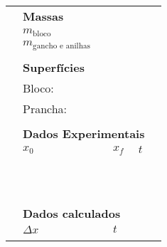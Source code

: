 \begin{table*}[!ht]
\centering
\begin{tabular}{lp{25mm}p{25mm}p{25mm}l}
\toprule
    & \textbf{Massas} & \\
    \cmidrule{2-3}
    & \cellcolor[gray]{0.89} $m_{\text{bloco}}$ & \cellcolor[gray]{0.92} & \\
    & \cellcolor[gray]{0.95} $m_{\text{gancho e anilhas}}$ & \cellcolor[gray]{0.97} & \\
    \cmidrule{2-3}
    \\
    & \textbf{Superfícies} \\
    \cmidrule{2-3}
    & \cellcolor[gray]{0.89} Bloco: & \cellcolor[gray]{0.92} \\
    & \cellcolor[gray]{0.95} Prancha: & \cellcolor[gray]{0.97} \\
    \cmidrule{2-3}
    \\
	&\multicolumn{3}{l}{\textbf{Dados Experimentais}} \\
	\cmidrule{2-4}
	& $x_0$ & $x_f$ & $t$ & \\
	\cmidrule{2-4}
	& \cellcolor[gray]{0.89} & \cellcolor[gray]{0.92} & \cellcolor[gray]{0.89} \\
	& \cellcolor[gray]{0.95} & \cellcolor[gray]{0.97} & \cellcolor[gray]{0.95} \\
	& \cellcolor[gray]{0.89} & \cellcolor[gray]{0.92} & \cellcolor[gray]{0.89} \\
	& \cellcolor[gray]{0.95} & \cellcolor[gray]{0.97} & \cellcolor[gray]{0.95} \\
	& \cellcolor[gray]{0.89} & \cellcolor[gray]{0.92} & \cellcolor[gray]{0.89} \\
	& \cellcolor[gray]{0.95} & \cellcolor[gray]{0.97} & \cellcolor[gray]{0.95} \\
	& \cellcolor[gray]{0.89} & \cellcolor[gray]{0.92} & \cellcolor[gray]{0.89} \\
	& \cellcolor[gray]{0.95} & \cellcolor[gray]{0.97} & \cellcolor[gray]{0.95} \\
	& \cellcolor[gray]{0.89} & \cellcolor[gray]{0.92} & \cellcolor[gray]{0.89} \\
	& \cellcolor[gray]{0.95} & \cellcolor[gray]{0.97} & \cellcolor[gray]{0.95} \\
	\cmidrule{2-4}
\\
	& \multicolumn{3}{l}{\textbf{Dados calculados}} \\
	\cmidrule{2-3}
	& $\Delta x$ & $t$ \\
	\cmidrule{2-3}
	& \cellcolor[gray]{0.89} & \cellcolor[gray]{0.92}  \\ 

\end{tabular}
\end{table*}
